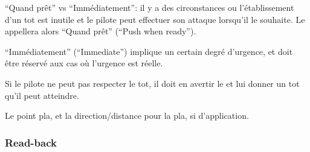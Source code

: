 \begin{e1}
\begin{e2}
\begin{e3}
\begin{e4}
\begin{e5}
				\end{e5}
				
				\item ``Quand prêt'' vs ``Immédiatement'': il y a des circonstances ou l'établissement d'un \gls{tot} est inutile et le pilote peut effectuer son attaque lorsqu'il le souhaite. Le \ja{} appellera alors ``Quand prêt'' (``Push when ready'').
				
				``Immédiatement'' (``Immediate'') implique un certain degré d'urgence, et doit être réservé aux cas où l'urgence est réelle.
				
			\end{e4}
			
			\item Si le pilote ne peut pas respecter le \gls{tot}, il doit en avertir le \ja{} et lui donner un \gls{tot} qu'il peut atteindre.
			
		\end{e3}
		
		\item Le point \gls{pla}, et la direction/distance pour la \gls{pla}, si d'application.
		
	\end{e2}
	
\end{e1}
	
\subsubsection{Read-back}%
	
